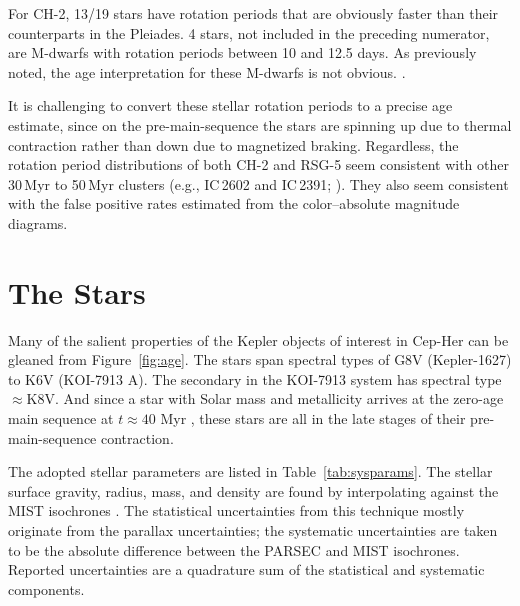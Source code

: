 \documentclass[12pt,twocolumn,tighten,linenumbers,trackchanges]{aastex63}
\begin{document}
For CH-2, 13/19 stars have rotation periods that are obviously faster
than their counterparts in the Pleiades.  4 stars, not included
in the preceding numerator, are M-dwarfs with rotation periods between
10 and 12.5 days.  As previously noted, the age interpretation for
these M-dwarfs is not obvious.  .

It is challenging to convert these stellar rotation periods to a
precise age estimate, since on the pre-main-sequence the stars are
spinning up due to thermal contraction rather than down due to
magnetized braking.  Regardless, the rotation period distributions of
both CH-2 and RSG-5 seem consistent with other 30\,Myr to 50\,Myr
clusters ({e.g.}, IC\,2602 and IC\,2391;
\citealt{douglas_stephanie_t_2021_5131306}).  They also seem
consistent with the false positive rates estimated from the
color--absolute magnitude diagrams.


\section{The Stars}
\label{sec:stars}



Many of the salient properties of the Kepler objects of interest in Cep-Her can be
gleaned from Figure~\ref{fig:age}.  The stars span spectral types of
G8V (Kepler-1627) to K6V (KOI-7913 A).  The secondary in the KOI-7913
system has spectral type $\approx$K8V.  And since a star with
Solar mass and metallicity arrives at the zero-age main sequence at
$t\approx40$ Myr \citep{choi_mesa_2016}, these stars are all in the
late stages of their pre-main-sequence contraction.  

The adopted stellar parameters are listed in
Table~\ref{tab:sysparams}.  The stellar surface gravity, radius, mass,
and density are found by interpolating against the MIST isochrones
\citep{choi_mesa_2016}.  The statistical uncertainties from this
technique mostly originate from the parallax uncertainties; the
systematic uncertainties are taken to be the absolute difference
between the PARSEC \citep{bressan_parsec_2012} and MIST isochrones.
Reported uncertainties are a quadrature sum of the statistical and
systematic components. 
\end{document}
